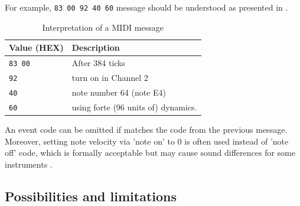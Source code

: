 \documentclass[a4paper, 11pt, twoside]{report}
\theoremstyle{definition}
\begin{document}
For example, \texttt{83 00 92 40 60} message should be understood as presented in . \par

\begin{table}[H]
    \centering
    \caption{Interpretation of a MIDI message} \vskip16pt
    \label{tab:message}
    \begin{tabular}{ | M{3cm} S{6cm} | }
        \hline
        \setlength{\baselineskip}{12pt}\small Value (HEX) & \setlength{\baselineskip}{12pt}\small Description                  \\ \hline
        \setlength{\baselineskip}{12pt}\texttt{83 00}     & \setlength{\baselineskip}{12pt}After 384 ticks                     \\
        \setlength{\baselineskip}{12pt}\texttt{92}        & \setlength{\baselineskip}{12pt}turn on in Channel 2                \\
        \setlength{\baselineskip}{12pt}\texttt{40}        & \setlength{\baselineskip}{12pt}note number 64 (note E4)            \\
        \setlength{\baselineskip}{12pt}\texttt{60}        & \setlength{\baselineskip}{12pt}using forte (96 units of) dynamics. \\ \hline
    \end{tabular}
\end{table}

An event code can be omitted if matches the code from the previous message. Moreover, setting note velocity via 'note on' to 0 is often used instead of 'note off' code, which is formally acceptable but may cause sound differences for some instruments \cite{MIDI1_spec}. \par

\subsection{Possibilities and limitations}
\end{document}
